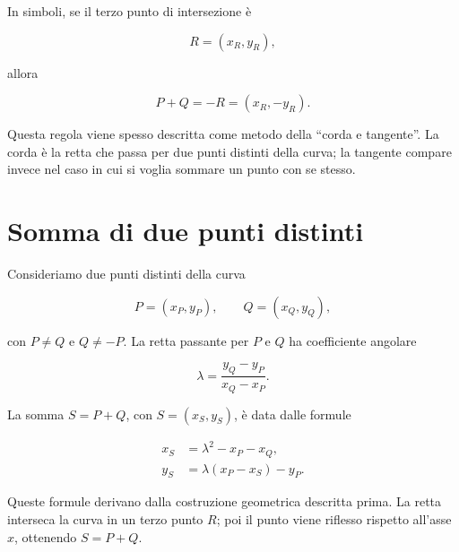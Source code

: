 \documentclass[12pt,a4paper,oneside]{report}
\begin{document}
In simboli, se il terzo punto di intersezione è

\[
R=(x_R,y_R),
\]

allora

\[
P+Q = -R = (x_R,-y_R).
\]

Questa regola viene spesso descritta come metodo della ``corda e tangente''. La corda è la retta che passa per due punti distinti della curva; la tangente compare invece nel caso in cui si voglia sommare un punto con se stesso.

\section{Somma di due punti distinti}

Consideriamo due punti distinti della curva

\[
P=(x_P,y_P), \qquad Q=(x_Q,y_Q),
\]

con \(P \neq Q\) e \(Q \neq -P\). La retta passante per \(P\) e \(Q\) ha coefficiente angolare

\begin{equation}
    \lambda = \frac{y_Q-y_P}{x_Q-x_P}.
    \label{eq:lambda-add-real}
\end{equation}

La somma \(S=P+Q\), con \(S=(x_S,y_S)\), è data dalle formule

\begin{align}
    x_S &= \lambda^2 - x_P - x_Q, \label{eq:add-xs-real} \\
    y_S &= \lambda(x_P-x_S)-y_P. \label{eq:add-ys-real}
\end{align}

Queste formule derivano dalla costruzione geometrica descritta prima. La retta interseca la curva in un terzo punto \(R\); poi il punto viene riflesso rispetto all'asse \(x\), ottenendo \(S=P+Q\).
\end{document}
